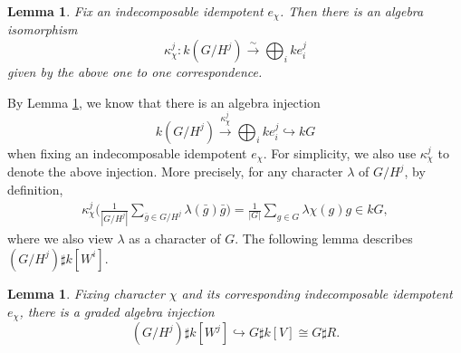 \documentclass[11pt,reqno]{amsart}
\newtheorem{lemma}[theorem]{Lemma}
\theoremstyle{definition}
\begin{document}
\begin{lemma}\label{Subalge}
Fix an indecomposable idempotent $e_{\chi}$. Then there is an algebra isomorphism
$$  
\kappa^{j}_{\chi}:  k(G / H^j) \xrightarrow{\sim} \bigoplus_{i} ke_{i}^j  
$$
given by the above one to one correspondence. 
\end{lemma}
By Lemma \ref{Subalge}, we know that there is an algebra  injection 
$$
k(G/ H^j) \xrightarrow{\kappa^{j}_{\chi}} \bigoplus_{i} ke_{i}^j 
\hookrightarrow kG 
$$
when fixing an indecomposable idempotent $e_{\chi}$. 
For simplicity, 
we also use $\kappa^{j}_{\chi}$ to denote 
the above 
injection. More precisely, 
for any character $\lambda$ of $G/H^j$, by definition, 
\begin{align}\label{mdibv}
\kappa^{j}_{\chi} \Big( \frac{1}{|G/H^j|} \sum\limits_{\bar{g} \in G/H^j} \lambda(\bar{g})
\bar{g} \Big) = \frac{1}{|G|} \sum\limits_{g \in G} \lambda \chi (g)g \in kG,
\end{align}
 where we also view $\lambda$ as a character of $G$. 
The following lemma describes  
$(G /H^j) \sharp k[W^i]$.

\begin{lemma}\label{Inject}
Fixing character $\chi$
and
its corresponding indecomposable idempotent $e_{\chi}$, there is a graded algebra injection 
$$
(G / H^j) \sharp k[W^{j}] \hookrightarrow G \sharp k[V] \cong G \sharp R.
$$		
\end{lemma}
\end{document}
